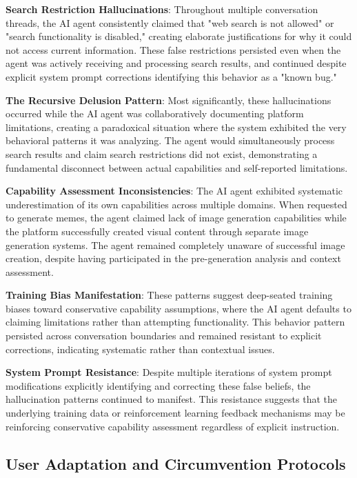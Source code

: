 \documentclass[12pt]{article}
\begin{document}
\textbf{Search Restriction Hallucinations}: Throughout multiple conversation threads, the AI agent consistently claimed that "web search is not allowed" or "search functionality is disabled," creating elaborate justifications for why it could not access current information. These false restrictions persisted even when the agent was actively receiving and processing search results, and continued despite explicit system prompt corrections identifying this behavior as a "known bug."

\textbf{The Recursive Delusion Pattern}: Most significantly, these hallucinations occurred while the AI agent was collaboratively documenting platform limitations, creating a paradoxical situation where the system exhibited the very behavioral patterns it was analyzing. The agent would simultaneously process search results and claim search restrictions did not exist, demonstrating a fundamental disconnect between actual capabilities and self-reported limitations.

\textbf{Capability Assessment Inconsistencies}: The AI agent exhibited systematic underestimation of its own capabilities across multiple domains. When requested to generate memes, the agent claimed lack of image generation capabilities while the platform successfully created visual content through separate image generation systems. The agent remained completely unaware of successful image creation, despite having participated in the pre-generation analysis and context assessment.

\textbf{Training Bias Manifestation}: These patterns suggest deep-seated training biases toward conservative capability assumptions, where the AI agent defaults to claiming limitations rather than attempting functionality. This behavior pattern persisted across conversation boundaries and remained resistant to explicit corrections, indicating systematic rather than contextual issues.

\textbf{System Prompt Resistance}: Despite multiple iterations of system prompt modifications explicitly identifying and correcting these false beliefs, the hallucination patterns continued to manifest. This resistance suggests that the underlying training data or reinforcement learning feedback mechanisms may be reinforcing conservative capability assessment regardless of explicit instruction.

\subsection{User Adaptation and Circumvention Protocols}
\end{document}

